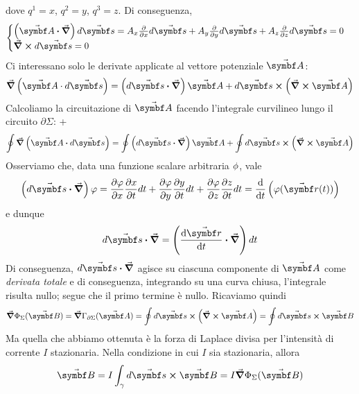 dove $q^1=x$, $q^2=y$, $q^3=z$.
Di conseguenza,
\begin{equation*}
	\begin{cases}
		\left(\vba{A}\vdot\grad\right)d\vba{s}=A_x\pdv{x} d\vba{s}+A_y\pdv{y} d\vba{s}+A_z\pdv{z} d\vba{s}=0\\
		\curl{d\vba{s}}=0
	\end{cases}
\end{equation*} %
Ci interessano solo le derivate applicate al vettore potenziale $\vba{A}$:
\begin{equation*}
	\grad{\left(\vba{A}\cdot d\vba{s}\right)}=\left(d\vba{s}\vdot\grad\right)\vba{A}+d\vba{s}\cross\left(\grad\cross\vba{A}\right)
\end{equation*}
Calcoliamo la circuitazione di $\vba{A}$ facendo l'integrale curvilineo lungo il circuito $\partial \Sigma$:
+\begin{equation}
	\oint\grad{\left(\vba{A}\vdot d\vba{s}\right)}=\oint \left(d\vba{s}\vdot\grad\right)\vba{A}+\oint d\vba{s}\cross\left(\grad\cross\vba{A}\right)
\end{equation}
Osserviamo che, data una funzione scalare arbitraria $\oldphi$, vale
\begin{equation*}
	\left(d\vba{s}\vdot\grad\right)\phi=\pdv{\phi}{x}\pdv{x}{t}dt+\pdv{\phi}{y}\pdv{y}{t}dt+\pdv{\phi}{z}\pdv{z}{t}dt=\dv{t} \left(\phi(\vba{r}(t))\right)
\end{equation*}
e dunque
\begin{equation}
	d\vba{s}\vdot\grad=\left(\dv{\vba{r}}{t}\vdot\grad\right)dt
\end{equation}
Di conseguenza, $d\vba{s}\vdot\grad$ agisce su ciascuna componente di $\vba{A}$ come \textit{derivata totale} e di conseguenza, integrando su una curva chiusa, l'integrale risulta nullo; segue che il primo termine è nullo. Ricaviamo quindi
\begin{equation*}
	\grad{\Phi_{\Sigma}(\vba{B})}=\grad{\Gamma_{\partial \Sigma}(\vba{A})}=\oint d\vba{s}\cross\left(\grad\cross\vba{A}\right)=\oint d\vba{s}\cross\vba{B}
\end{equation*}
Ma quella che abbiamo ottenuta è la forza di Laplace divisa per l'intensità di corrente $I$ stazionaria. Nella condizione in cui $I$ sia stazionaria, allora
\begin{equation}
	\vba{B}=I\int_{\gamma}d\vba{s}\cross\vba{B}=I\grad{\Phi_{\Sigma}(\vba{B})}
\end{equation}
